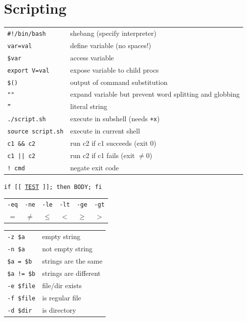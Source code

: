 \documentclass[a4paper, twocolumn]{article}
\renewcommand{\tt}{\texttt}
\begin{document}
\section{Scripting}
\begin{tabular}{ll}
    \verb|#!/bin/bash|  & shebang (specify interpreter)             \\
    \tt{var=val}        & define variable (no spaces!)              \\
    \verb|$var|         & access variable                           \\
    \verb|export V=val| & expose variable to child procs            \\
    \verb|$()|          & output of command substitution            \\
    \tt{""}             & expand variable but prevent word splitting and globbing\\
    \tt{''}             & literal string                            \\
    \tt{./script.sh}    & execute in subshell (needs \tt{+x})       \\
    \tt{source script.sh}& execute in current shell                 \\
    \verb|c1 && c2|     & run c2 if c1 succeeds (exit 0)            \\
    \verb!c1 || c2!    & run c2 if c1 fails (exit $\neq 0$)        \\
    \verb|! cmd|        & negate exit code                          
\end{tabular}
\vspace{0.3cm}

\tt{if [[ \underline{TEST} ]]; then BODY; fi}
\vspace{0.3cm}

\begin{tabular}{cccccc}
    \verb|-eq| & \verb|-ne| & \verb|-le| & \verb|-lt| & \verb|-ge| & \verb|-gt| \\
    $=$        & $\neq$     & $\leq$     & $<$        & $\geq$     & $>$
\end{tabular}
\vspace{0.3cm}

\begin{tabular}{ll}
    \verb|-z $a|        & empty string                              \\
    \verb|-n $a|        & not empty string                          \\
    \verb|$a = $b|      & strings are the same                      \\
    \verb|$a != $b|     & strings are different                     \\
    \verb|-e $file|     & file/dir exists                           \\
    \verb|-f $file|     & is regular file                           \\
    \verb|-d $dir|      & is directory
\end{tabular}
\vspace{0.5cm}
\end{document}

